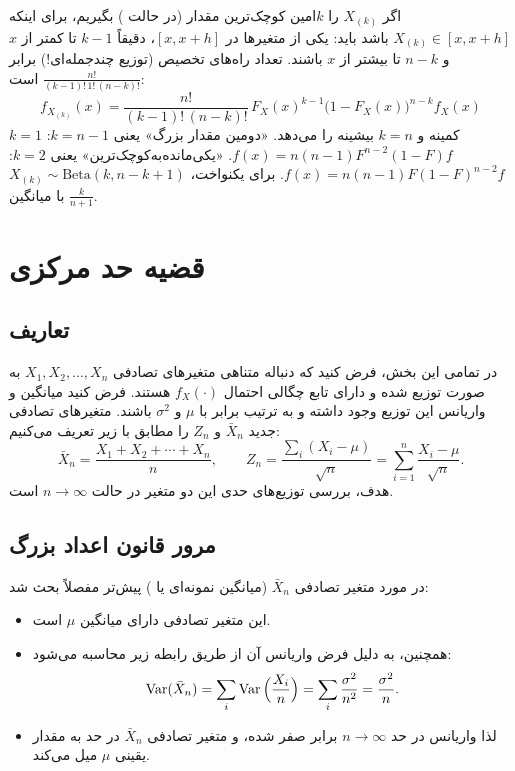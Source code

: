 \begin{question}
\begin{answer}
اگر $X_{(k)}$ را $k$امین کوچک‌ترین مقدار (در حالت ) بگیریم، برای اینکه $X_{(k)}\in[x,x+h]$ باشد باید: یکی از متغیرها در $[x,x+h]$، دقیقاً $k-1$ تا کمتر از $x$ و $n-k$ تا بیشتر از $x$ باشند. تعداد راه‌های تخصیص (توزیع چندجمله‌ای!) برابر $\frac{n!}{(k-1)!\,1!\,(n-k)!}$ است:
\[
\boxed{\ f_{X_{(k)}}(x)=\frac{n!}{(k-1)!\,(n-k)!}\,F_X(x)^{k-1}\big(1-F_X(x)\big)^{n-k}f_X(x)\ }
\]
$k=1$ کمینه و $k=n$ بیشینه را می‌دهد. «دومین مقدار بزرگ» یعنی $k=n-1$: $f(x)=n(n-1)F^{n-2}(1-F)f$. «یکی‌مانده‌به‌کوچک‌ترین» یعنی $k=2$: $f(x)=n(n-1)F(1-F)^{n-2}f$. برای یکنواخت، $X_{(k)}\sim\mathrm{Beta}(k,n-k+1)$ با میانگین $\frac{k}{n+1}$.
\end{answer}
\end{question}

\section{قضیه حد مرکزی }

\subsection{تعاریف}
در تمامی این بخش، فرض کنید که دنباله متناهی متغیرهای تصادفی $X_1,X_2,\ldots,X_n$ به صورت  توزیع شده و دارای تابع چگالی احتمال $f_X(\cdot)$ هستند. فرض کنید میانگین و واریانس این توزیع وجود داشته و به ترتیب برابر با $\mu$ و $\sigma^2$ باشند. متغیرهای تصادفی جدید $\bar X_n$ و $Z_n$ را مطابق با زیر تعریف می‌کنیم:
\[
\bar X_n=\frac{X_1+X_2+\cdots+X_n}{n},\qquad
Z_n=\frac{\sum_i(X_i-\mu)}{\sqrt n}=\sum_{i=1}^{n}\frac{X_i-\mu}{\sqrt n}.
\]
هدف، بررسی توزیع‌های حدی این دو متغیر در حالت $n\to\infty$ است.

\subsection{مرور قانون اعداد بزرگ}
در مورد متغیر تصادفی $\bar X_n$ (میانگین نمونه‌ای یا ) پیش‌تر مفصلاً بحث شد:
\begin{itemize}
\item این متغیر تصادفی دارای میانگین $\mu$ است.
\item همچنین، به دلیل فرض  واریانس آن از طریق رابطه زیر محاسبه می‌شود:
\[
\operatorname{Var}(\bar X_n)=\sum_i\operatorname{Var}\Big(\frac{X_i}{n}\Big)=\sum_i\frac{\sigma^2}{n^2}=\frac{\sigma^2}{n}.
\]
\item لذا واریانس در حد $n\to\infty$ برابر صفر شده، و متغیر تصادفی $\bar X_n$ در حد به مقدار یقینی $\mu$ میل می‌کند.
\end{itemize}

